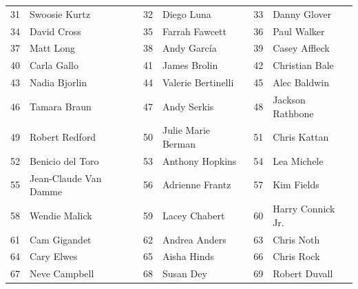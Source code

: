 \documentclass[11pt, a4paper]{article}
\numberwithin{equation}{subsection}
\begin{document}
\begin{appendices}
\begin{table}[htbp]
\begin{tabular}{|c|l|c|l|c|l|}
        31          & Swoosie Kurtz                       & 32          & Diego Luna                          & 33          & Danny Glover                       \\ 
        34          & David Cross                         & 35          & Farrah Fawcett                      & 36          & Paul Walker                        \\ 
        37          & Matt Long                           & 38          & Andy García                         & 39          & Casey Affleck                      \\ 
        40          & Carla Gallo                         & 41          & James Brolin                        & 42          & Christian Bale                     \\ 
        43          & Nadia Bjorlin                       & 44          & Valerie Bertinelli                  & 45          & Alec Baldwin                       \\ 
        46          & Tamara Braun                        & 47          & Andy Serkis                         & 48          & Jackson Rathbone                   \\ 
        49          & Robert Redford                      & 50          & Julie Marie Berman                  & 51          & Chris Kattan                      \\ 
        52          & Benicio del Toro                    & 53          & Anthony Hopkins                     & 54          & Lea Michele                        \\ 
        55          & Jean-Claude Van Damme               & 56          & Adrienne Frantz                     & 57          & Kim Fields                        \\ 
        58          & Wendie Malick                       & 59          & Lacey Chabert                       & 60          & Harry Connick Jr.                  \\ 
        61          & Cam Gigandet                        & 62          & Andrea Anders                       & 63          & Chris Noth                        \\ 
        64          & Cary Elwes                          & 65          & Aisha Hinds                         & 66          & Chris Rock                        \\ 
        67          & Neve Campbell                       & 68          & Susan Dey                           & 69          & Robert Duvall                     \\ 

\end{tabular}
\end{table}
\end{appendices}
\end{document}

